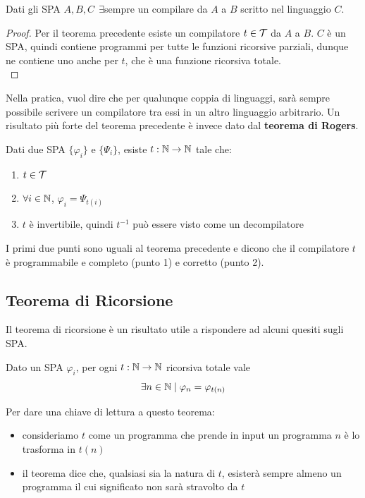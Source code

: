 \begin{coroll}
	Dati gli SPA $A,B,C \ \ \exists$sempre un compilare da $A$ a $B$ scritto nel linguaggio $C$.
\end{coroll}
\begin{proof}
	Per il teorema precedente esiste un compilatore $t \in \mathcal{T}$ da $A$ a $B$. $C$ è un SPA, quindi contiene programmi per tutte le funzioni ricorsive parziali, dunque ne contiene uno anche per $t$, che è una funzione ricorsiva totale. \\
\end{proof}

Nella pratica, vuol dire che per qualunque coppia di linguaggi, sarà sempre possibile scrivere un compilatore tra essi in un altro linguaggio arbitrario. Un risultato più forte del teorema precedente è invece dato dal \textbf{teorema di Rogers}.\\

\begin{theor}
	Dati due SPA $\{\varphi_i\}$ e $\{\Psi_i\}$, esiste $t: \mathbb{N} \rightarrow \mathbb{N}$ tale che:
	\begin{enumerate}
		\item $t \in \mathcal{T}$ 
		\item $\forall i \in \mathbb{N}$, $\varphi_i = \Psi_{t(i)}$ 
		\item $t$ è invertibile, quindi $t^{-1}$ può essere visto come un decompilatore
	\end{enumerate}
\end{theor}

I primi due punti sono uguali al teorema precedente e dicono che il compilatore $t$ è programmabile e completo (punto 1) e corretto (punto 2).

\subsection{Teorema di Ricorsione}

Il teorema di ricorsione è un risultato utile a rispondere ad alcuni quesiti sugli SPA. \\

\begin{theor}
	Dato un SPA $\varphi_i$, per ogni $t: \mathbb{N} \rightarrow \mathbb{N}$ ricorsiva totale vale
	$$ \exists n \in \mathbb{N} \mid \varphi_n = \varphi_{t(n)} $$
\end{theor}

Per dare una chiave di lettura a questo teorema:
\begin{itemize}
	\item consideriamo $t$ come un programma che prende in input un programma $n$ è lo trasforma in $t(n)$
	\item il teorema dice che, qualsiasi sia la natura di $t$, esisterà sempre almeno un programma il cui significato non sarà stravolto da $t$
\end{itemize}

